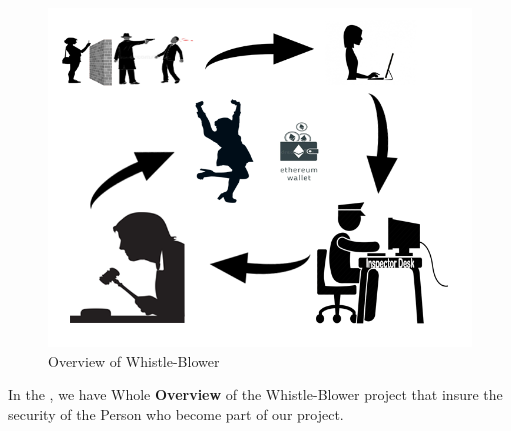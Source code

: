 \begin{figure}[h]
	\centering
	\includegraphics[width=0.50\textheight]{figures/02.png}
	\caption{Overview of Whistle-Blower}
	\label{fig:tst}
\end{figure}
In the , we have Whole \textbf{ Overview } of the Whistle-Blower project that insure the security of the Person who become part of our project.\\

